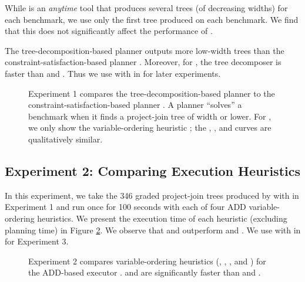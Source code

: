 While \Lg{} is an \emph{anytime} tool that produces several trees (of decreasing widths) for each benchmark, we use only the first tree produced on each benchmark.
We find that this does not significantly affect the performance of \procount{}.

The tree-decomposition-based planner \Lg{} outputs more low-width trees than the constraint-satisfaction-based planner \htb{}.
Moreover, for \Lg{}, the tree decomposer \flowcutter{} is faster than \htd{} and \tamaki{}.
Thus we use \Lg{} with \flowcutter{} in \procount{} for later experiments.
\begin{figure}[t]
    \centering
    
    \caption{
        Experiment 1 compares the tree-decomposition-based planner \Lg{} to the constraint-satisfaction-based planner \htb{}.
	    A planner ``solves'' a benchmark when it finds a project-join tree of width \maxWidth{} or lower.
        For \htb, we only show the variable-ordering heuristic \mcs{}; the \lexp{}, \lexm{}, and \minfill{} curves are qualitatively similar.
    }
    \label{figPlanning}
\end{figure}


\subsection{Experiment 2: Comparing Execution Heuristics}

In this experiment, we take the 346 graded project-join trees produced by \Lg{} with \flowcutter{} in Experiment 1 %
and run \dmc{} once for 100 seconds with each of four ADD variable-ordering heuristics. 
We present the execution time of each heuristic (excluding planning time) in Figure \ref{figExecution}. 
We observe that \mcs{} and \lexp{} outperform \lexm{} and \minfill{}.
We use \dmc{} with \mcs{} in \procount{} for Experiment 3.
\begin{figure}[t]
    \centering
    
    \caption{
        Experiment 2 compares variable-ordering heuristics (\mcs{}, \lexp, \lexm, and \minfill{}) for the ADD-based executor \dmc.
        \mcs{} and \lexp{} are significantly faster than \lexm{} and \minfill{}.
    }
    \label{figExecution}
\end{figure}

